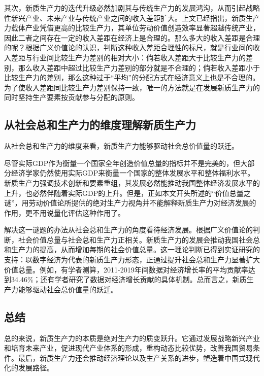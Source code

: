 其次，新质生产力的迭代升级必然加剧其与传统生产力的发展鸿沟\cite[39-40]{ChenZhangHongGuanJingJiBoDongShiZhengFenXiDeYiZhongSiLuShiLunShengChanLiFeiPingHengJieGouYuJingJiBoDong1999}，从而引起战略性新兴产业、未来产业与传统产业之间的收入差距扩大\cite[31]{CaiJiMingXinZhiShengChanLiDeFaZhanDuiJieZhiChuangZaoHeJingJiZengChangDeGongXian2024}。上文已经指出，新质生产力载体产业凭借更高的比较生产力​，其单位劳动价值创造效率显著超越传统产业，因此二者之间存在一定的收入差距在经济上是合理的。那么多大的收入差距是合理的呢？根据广义价值论的认识，判断这种收入差距合理性的标尺，就是行业间的收入差距与行业间比较生产力差别的相对大小：倘若收入差距大于比较生产力的差别，那么收入差距中超过比较生产力差别的部分就是不合理的；倘若收入差距小于比较生产力的差别，那么这种过于“平均”的分配方式在经济意义上也是不合理\cite[69]{CaiJiMingLongDuanHeJingZhengXingYeDeBiJiaoShengChanLiYuShouRuChaiJuJiYuGuangYiJieZhiLunDeFenXi2014}的。为了使收入差距同比较生产力差别保持一致，唯一的方法就是在发展新质生产力的同时坚持生产要素按贡献参与分配的原则\cite[58]{CaiJiMingMaKeSiLaoDongShengChanLiYuJieZhiLiangZhengXiangGuanYuanLiDeKuoZhanJiYingYongJianLunXinZhiShengChanLiDeFaZhanYuWoGuoJiBenJingJiZhiDuDeWanShan2025}。

\subsection{从社会总和生产力的维度理解新质生产力}

从社会总和生产力的维度来看，新质生产力能够驱动社会总价值量的跃迁。

尽管实际GDP作为衡量一个国家全年创造价值总量的指标并不是完美的，但大部分经济学家仍然使用实际GDP来衡量一个国家的整体发展水平和整体福利水平\cite[386]{BaoLuo*SaMouErSenJingJiXueDiShiJiuBan2012}\cite[17-24]{n.GeLiGaoLi*ManKunJingJiXueYuanLiDi7BanHongGuanJingJiFenCe2015}。新质生产力强调技术创新和要素重组，其发展必然能推动我国整体经济发展水平的上升，也必然伴随着实际GDP的上升。但是，正如本文开头所述的“价值总量之谜”，用劳动价值论所提供的绝对生产力视角并不能解释新质生产力对经济发展的作用，更不用说量化评估这种作用了。

解决这一谜题的办法从社会总和生产力的角度看待经济发展。根据广义价值论的判断，社会价值总量与社会总和生产力正相关。新质生产力的发展会推动我国社会总和生产力的提高，从而增加每期的社会价值总量。这一理论判断已得到实证研究的支持：以数字经济为代表的新质生产力形态，正通过提升社会总和生产力显著扩大价值总量。例如，有学者测算，2011-2019年间数据对经济增长率的平均贡献率达到34.46\%\cite[63]{LiuTaoXiongShuJuZiBenGuSuanJiDuiZhongGuoJingJiZengChangDeGongXianJiYuShuJuJieZhiLianDeShiJiao2023}；还有学者研究了数据对经济增长贡献的具体机制\cite{CaiJiMingLunShuJuYaoSuAnGongXianCanYuFenPeiDeJieZhiJiChuJiYuGuangYiJieZhiLunDeShiJiao2023}\cite{RenBaoPingShuZiXinZhiShengChanLiTuiDongJingJiGaoZhiLiangFaZhanDeLuoJiYuLuJing2023}。总而言之，新质生产力能够驱动社会总价值量的跃迁。

\subsection{总结}

总的来说，新质生产力的本质是绝对生产力的质变跃升。它通过发展战略新兴产业和培育未来产业，促进现代产业体系的形成，重构动态比较优势，改善我国贸易条件。最后，新质生产力还会推动经济理论以及生产关系的进步，塑造着中国式现代化的发展路径。